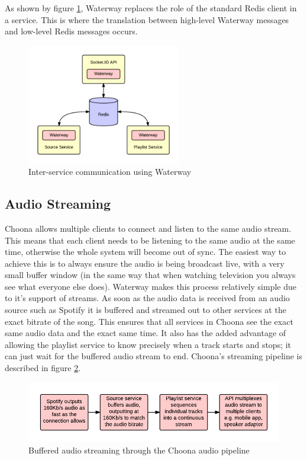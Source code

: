 As shown by figure \ref{fig:waterway-communication}, Waterway replaces the role of the standard Redis client in a service. This is where the translation between high-level Waterway messages and low-level Redis messages occurs.

\begin{figure}[h!]
  \centering
  \includegraphics[width=0.6\textwidth]{./img/waterway.png}
  \caption{Inter-service communication using Waterway}
  \label{fig:waterway-communication}
\end{figure}


\subsection{Audio Streaming}

Choona allows multiple clients to connect and listen to the same audio stream. This means that each client needs to be listening to the same audio at the same time, otherwise the whole system will become out of sync. The easiest way to achieve this is to always ensure the audio is being broadcast live, with a very small buffer window (in the same way that when watching television you always see what everyone else does). Waterway makes this process relatively simple due to it's support of streams. As soon as the audio data is received from an audio source such as Spotify it is buffered and streamed out to other services at the exact bitrate of the song. This ensures that all services in Choona see the exact same audio data and the exact same time. It also has the added advantage of allowing the playlist service to know precisely when a track starts and stops; it can just wait for the buffered audio stream to end. Choona's streaming pipeline is described in figure \ref{fig:streaming}.

\begin{figure}[h!]
  \centering
  \includegraphics[width=1\textwidth]{./img/streaming.png}
  \caption{Buffered audio streaming through the Choona audio pipeline}
  \label{fig:streaming}
\end{figure}

